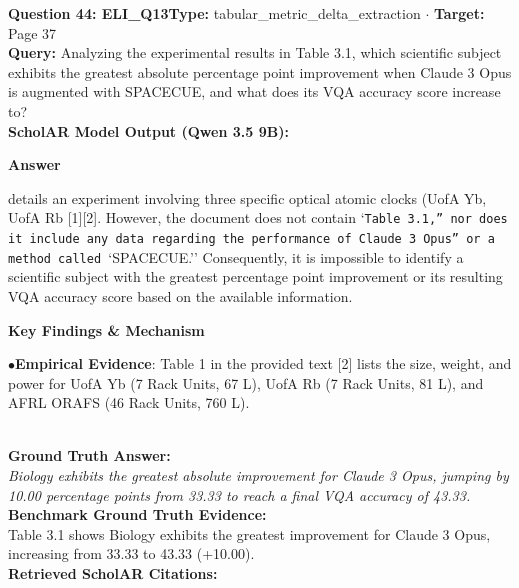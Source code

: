 \documentclass[10pt,a4paper]{article}
\begin{document}
\begin{tcolorbox}[questionbox]
{\noindent\bfseries\large\color{navy} Question 44: ELI\_Q13}\hfill {\footnotesize\color{darkteal}\textbf{Type:} tabular\_metric\_delta\_extraction $\cdot$ \textbf{Target:} Page 37}\\[4pt]
{\noindent\bfseries\color{accentblue} Query: } Analyzing the experimental results in Table 3.1, which scientific subject exhibits the greatest absolute percentage point improvement when Claude 3 Opus is augmented with SPACECUE, and what does its VQA accuracy score increase to?\\[6pt]
{\noindent\bfseries\color{navy} ScholAR Model Output (Qwen 3.5 9B):}\\[2pt]
{\small \noindent \textbf{Answer}\par\vspace{3pt}details an experiment involving three specific optical atomic clocks (UofA Yb, UofA Rb [1][2]. However, the document does not contain `\texttt{Table 3.1,'' nor does it include any data regarding the performance of }\texttt{Claude 3 Opus'' or a method called }`SPACECUE.'' Consequently, it is impossible to identify a scientific subject with the greatest percentage point improvement or its resulting VQA accuracy score based on the available information.\par\vspace{3pt}\noindent \textbf{Key Findings \& Mechanism}\par\vspace{3pt}\noindent\hspace*{8pt}$\bullet$\hspace*{4pt}\textbf{Empirical Evidence}: Table 1 in the provided text [2] lists the size, weight, and power for UofA Yb (7 Rack Units, 67 L), UofA Rb (7 Rack Units, 81 L), and AFRL ORAFS (46 Rack Units, 760 L).}\\[6pt]
{\noindent\bfseries\color{darkteal} Ground Truth Answer:}\\[2pt]
{\small\itshape Biology exhibits the greatest absolute improvement for Claude 3 Opus, jumping by 10.00 percentage points from 33.33 to reach a final VQA accuracy of 43.33.}\\[4pt]
{\noindent\bfseries\color{darkteal} Benchmark Ground Truth Evidence:}\\[2pt]
{\footnotesize Table 3.1 shows Biology exhibits the greatest improvement for Claude 3 Opus, increasing from 33.33 to 43.33 (+10.00).}\\[4pt]
{\noindent\bfseries\color{navy} Retrieved ScholAR Citations:}\\[2pt]

\end{tcolorbox}
\end{document}
